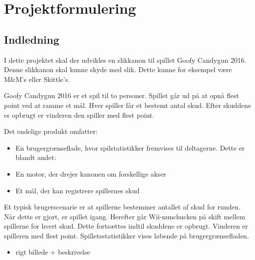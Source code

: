 \frontmatter
\maketitle
\AddToShipoutPicture*{\BackgroundPic}
\clearpage
\newpage

\tableofcontents

\newpage
\listoffigures
\newpage

\mainmatter


\chapter{Projektformulering}
\section{Indledning}
I dette projektet skal der udvikles en slikkanon til spillet Goofy Candygun 2016. Denne slikkanon skal kunne skyde med slik. Dette kunne for eksempel være M\&M’s eller Skittle’s.

Goofy Candygun 2016 er et spil til to personer. Spillet går ud på at opnå flest point ved at ramme et mål. Hver spiller får et bestemt antal skud. Efter skuddene er opbrugt er vinderen den spiller med flest point.


Det endelige produkt omfatter:
\begin{itemize}
	\item{En brugergrænseflade, hvor spilstatistikker fremvises til deltagerne. Dette er blandt andet:}
	\item{En motor, der drejer kanonen om forskellige akser}
	\item{Et mål, der kan registrere spillernes skud}
\end{itemize}

Et typisk brugerscenarie er at spillerne bestemmer antallet af skud for runden. Når dette er gjort, er spillet igang. Herefter går Wii-nunchucken på skift mellem spillerne for hvert skud. Dette fortsættes indtil skuddene er opbrugt. Vinderen er spilleren med flest point. Spilletsstatistikker vises løbende på brugergrænsefladen. 

\begin{itemize}
	\item{rigt billede + beskrivelse}
\end{itemize}


